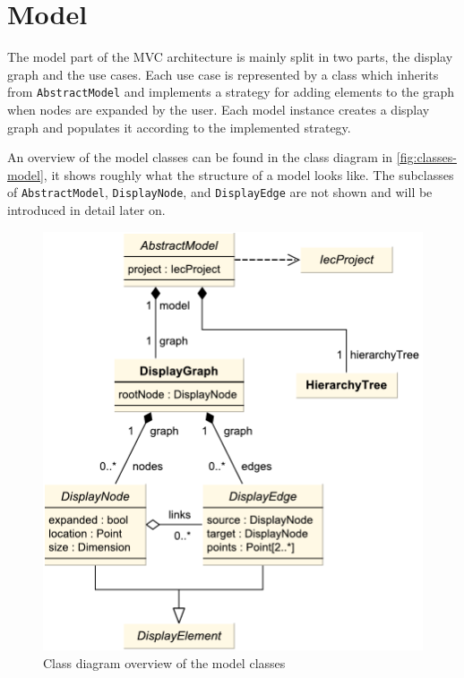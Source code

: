 \section{Model}

The model part of the MVC architecture is mainly split in two parts, the display graph and the use cases. Each use case 
is represented by a class which inherits from \lstinline|AbstractModel| and implements a strategy
\cite[pp.~315--323]{designpatterns} for adding elements to the graph when nodes are expanded by the user. Each model 
instance creates a display graph and populates it according to the implemented strategy.

An overview of the model classes can be found in the class diagram in \autoref{fig:classes-model}, it shows roughly 
what the structure of a model looks like. The subclasses of \lstinline|AbstractModel|, \lstinline|DisplayNode|, and 
\lstinline|DisplayEdge| are not shown and will be introduced in detail later on.

\begin{figure}[htb]
  \centering
    \includegraphics[scale=0.65]{bilder/classes-model}
  \caption{Class diagram overview of the model classes}
  \label{fig:classes-model}
\end{figure}

